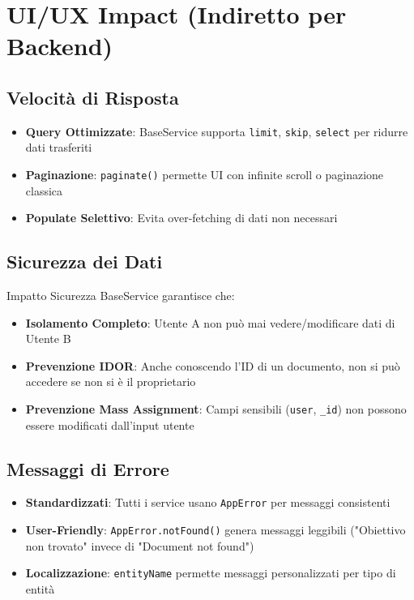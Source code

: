 \documentclass[11pt,a4paper]{article}
\begin{document}
\section{UI/UX Impact (Indiretto per Backend)}

\subsection{Velocità di Risposta}

\begin{itemize}
    \item \textbf{Query Ottimizzate}: BaseService supporta \texttt{limit}, \texttt{skip}, \texttt{select} per ridurre dati trasferiti
    \item \textbf{Paginazione}: \texttt{paginate()} permette UI con infinite scroll o paginazione classica
    \item \textbf{Populate Selettivo}: Evita over-fetching di dati non necessari
\end{itemize}

\subsection{Sicurezza dei Dati}

\begin{importantbox}{Impatto Sicurezza}
BaseService garantisce che:
\begin{itemize}
    \item \textbf{Isolamento Completo}: Utente A non può mai vedere/modificare dati di Utente B
    \item \textbf{Prevenzione IDOR}: Anche conoscendo l'ID di un documento, non si può accedere se non si è il proprietario
    \item \textbf{Prevenzione Mass Assignment}: Campi sensibili (\texttt{user}, \texttt{\_id}) non possono essere modificati dall'input utente
\end{itemize}
\end{importantbox}

\subsection{Messaggi di Errore}

\begin{itemize}
    \item \textbf{Standardizzati}: Tutti i service usano \texttt{AppError} per messaggi consistenti
    \item \textbf{User-Friendly}: \texttt{AppError.notFound()} genera messaggi leggibili ("Obiettivo non trovato" invece di "Document not found")
    \item \textbf{Localizzazione}: \texttt{entityName} permette messaggi personalizzati per tipo di entità
\end{itemize}
\end{document}
